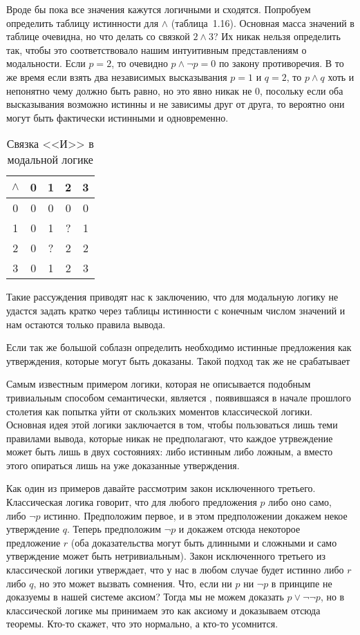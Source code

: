 Вроде бы пока все значения кажутся логичными и сходятся. Попробуем определить таблицу истинности для $\land$ (таблица~1.16). Основная масса значений в таблице очевидна, но что делать со связкой $2\land 3$?  Их никак нельзя определить так, чтобы это соответствовало нашим интуитивным представлениям о модальности. Если $p=2$, то очевидно $p\land\neg p = 0$ по закону противоречия. В то же время если взять два независимых высказывания $p=1$ и $q=2$, то $p\land q$ хоть и непонятно чему должно быть равно, но это явно никак не 0, посольку если оба высказывания возможно истинны и не зависимы друг от друга, то вероятно они могут быть фактически истинными и одновременно.

\begin{table}[h]
\centering
\begin{tabular}{c | c c c c}
$\land$ & 0 &1 &2 & 3 \\
\hline
0 & 0 & 0 & 0 & 0\\
1 & 0 & 1 & ? & 1\\
2 & 0 & ? & 2 & 2\\
3 & 0 & 1 & 2 & 3
\end{tabular}
\caption{Связка <<И>> в модальной логике}\label{table:kleene-or}
\end{table}

Такие рассуждения приводят нас к заключению, что для модальную логику не удастся задать кратко через таблицы истинности с конечным числом значений и нам остаются только правила вывода.

Если так же большой соблазн определить необходимо истинные предложения как утверждения, которые могут быть доказаны. Такой подход так же не срабатывает 


Самым известным примером логики, которая не описывается подобным тривиальным способом семантически, является , появившаяся в начале прошлого столетия как попытка уйти от скользких моментов классической логики. Основная идея этой логики заключается в том, чтобы пользоваться лишь теми правилами вывода, которые никак не предполагают, что каждое утрвеждение может быть лишь в двух состояниях: либо истинным либо ложным, а вместо этого опираться лишь на уже доказанные утверждения.

Как один из примеров давайте рассмотрим закон исключенного третьего. Классическая логика говорит, что для любого предложения $p$ либо оно само, либо $\neg p$ истинно. Предположим первое, и в этом предположении докажем некое утверждение $q$. Теперь предположим $\neg p$ и докажем отсюда некоторое предложение $r$ (оба доказательства могут быть длинными и сложными и само утверждение может быть нетривиальным). Закон исключенного третьего из классической логики утверждает, что у нас в любом случае будет истинно либо $r$ либо $q$, но это может вызвать сомнения. Что, если ни $p$ ни $\neg p$ в принципе не доказуемы в нашей системе аксиом? Тогда мы не можем доказать $p \lor \neg \neg p$, но в классической логике мы принимаем это как аксиому и доказываем отсюда теоремы. Кто-то скажет, что это нормально, а кто-то усомнится.

